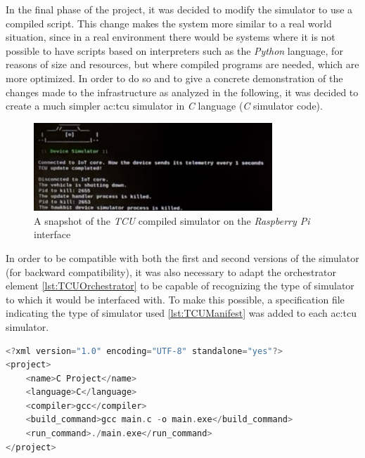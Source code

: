 In the final phase of the project, it was decided to modify the simulator to use a compiled script. This change makes the system more similar to a real world situation, since in a real environment there would be systems where it is not possible to have scripts based on interpreters such as the \textit{Python} language, for reasons of size and resources, but where compiled programs are needed, which are more optimized. In order to do so and to give a concrete demonstration of the changes made to the infrastructure as analyzed in the following, it was decided to create a much simpler \gls{ac:tcu} simulator in \textit{C} language (\textit{C} simulator code). 
\begin{figure}[h]  %
    \centering
    \includegraphics[width=0.8\textwidth]{images/TCUsimulatorC.png}  %
    \caption{A snapshot of the \textit{TCU} compiled simulator on the \textit{Raspberry Pi} interface}
    \label{fig:TCUsimulatorC}
\end{figure}

In order to be compatible with both the first and second versions of the simulator (for backward compatibility), it was also necessary to adapt the orchestrator element \ref{lst:TCUOrchestrator} to be capable of recognizing the type of simulator to which it would be interfaced with. To make this possible, a specification file indicating the type of simulator used \ref{lst:TCUManifest} was added to each \gls{ac:tcu} simulator.
\begin{lstlisting}[language=c, caption={Manifest example of compiled \textit{TCU} simulator}, label=lst:TCUManifest]
<?xml version="1.0" encoding="UTF-8" standalone="yes"?>
<project>
    <name>C Project</name>
    <language>C</language>
    <compiler>gcc</compiler>
    <build_command>gcc main.c -o main.exe</build_command>
    <run_command>./main.exe</run_command>
</project>
\end{lstlisting}

